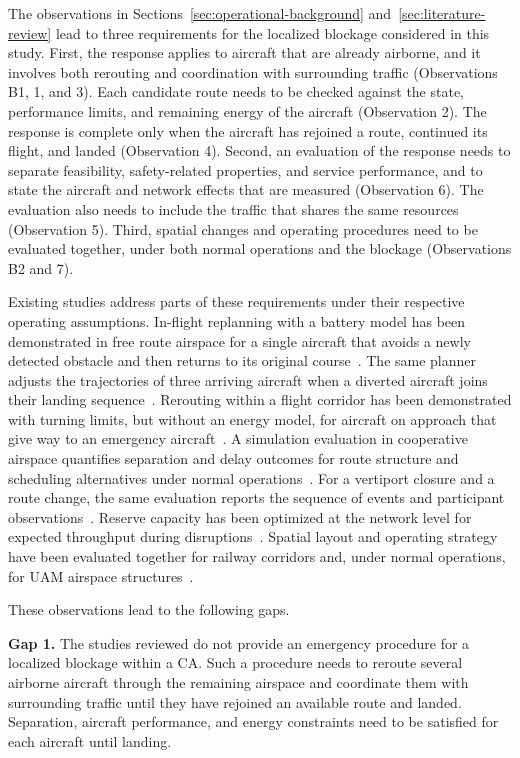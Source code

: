 \documentclass[11pt,letterpaper]{article}
\newcommand{\gap}[2]{\par\noindent\textbf{Gap #1.} #2\par}
\begin{document}
The observations in Sections~\ref{sec:operational-background} and~\ref{sec:literature-review} lead to three requirements for the localized blockage considered in this study. First, the response applies to aircraft that are already airborne, and it involves both rerouting and coordination with surrounding traffic (Observations B1, 1, and 3). Each candidate route needs to be checked against the state, performance limits, and remaining energy of the aircraft (Observation 2). The response is complete only when the aircraft has rejoined a route, continued its flight, and landed (Observation 4). Second, an evaluation of the response needs to separate feasibility, safety-related properties, and service performance, and to state the aircraft and network effects that are measured (Observation 6). The evaluation also needs to include the traffic that shares the same resources (Observation 5). Third, spatial changes and operating procedures need to be evaluated together, under both normal operations and the blockage (Observations B2 and 7).

Existing studies address parts of these requirements under their respective operating assumptions. In-flight replanning with a battery model has been demonstrated in free route airspace for a single aircraft that avoids a newly detected obstacle and then returns to its original course~\cite{Kim2024_L042}. The same planner adjusts the trajectories of three arriving aircraft when a diverted aircraft joins their landing sequence~\cite{Kim2024_L042}. Rerouting within a flight corridor has been demonstrated with turning limits, but without an energy model, for aircraft on approach that give way to an emergency aircraft~\cite{Variny2025_L015}. A simulation evaluation in cooperative airspace quantifies separation and delay outcomes for route structure and scheduling alternatives under normal operations~\cite{Prince2025_L041}. For a vertiport closure and a route change, the same evaluation reports the sequence of events and participant observations~\cite{Prince2025_L041}. Reserve capacity has been optimized at the network level for expected throughput during disruptions~\cite{Wei2024_L063}. Spatial layout and operating strategy have been evaluated together for railway corridors and, under normal operations, for UAM airspace structures~\cite{Tosstorff2026_L046,Ramee2021_L028}.

These observations lead to the following gaps.

\gap{1}{The studies reviewed do not provide an emergency procedure for a localized blockage within a CA. Such a procedure needs to reroute several airborne aircraft through the remaining airspace and coordinate them with surrounding traffic until they have rejoined an available route and landed. Separation, aircraft performance, and energy constraints need to be satisfied for each aircraft until landing.}
\end{document}
